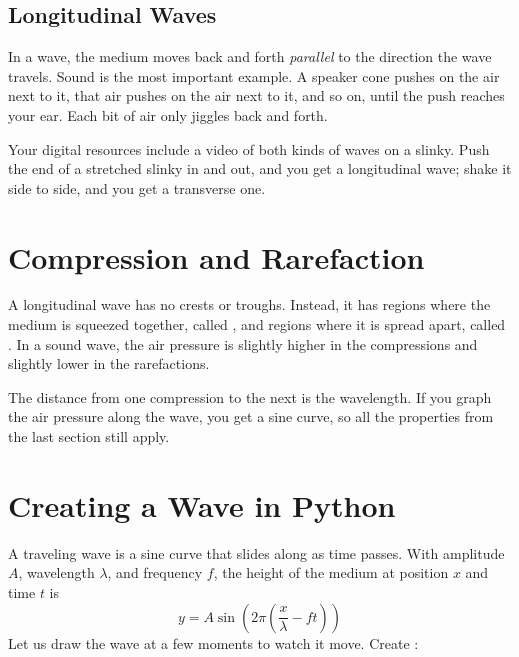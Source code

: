 \subsection*{Longitudinal Waves}
In a  wave, the medium moves
back and forth \emph{parallel} to the direction the wave travels. Sound is
the most important example. A speaker cone pushes on the air next to it,
that air pushes on the air next to it, and so on, until the push reaches
your ear. Each bit of air only jiggles back and forth.

Your digital resources include a video of both kinds of waves on a slinky.
Push the end of a stretched slinky in and out, and you get a longitudinal
wave; shake it side to side, and you get a transverse one.

\section{Compression and Rarefaction}

A longitudinal wave has no crests or troughs. Instead, it has regions where
the medium is squeezed together, called 
, and regions where it is spread apart, called
. In a sound wave, the air
pressure is slightly higher in the compressions and slightly lower in the
rarefactions.

\begin{center}
\end{center}

The distance from one compression to the next is the wavelength. If you
graph the air pressure along the wave, you get a sine curve, so all the
properties from the last section still apply.

\section{Creating a Wave in Python}

A traveling wave is a sine curve that slides along as time passes. With
amplitude $A$, wavelength $\lambda$, and frequency $f$, the height of the
medium at position $x$ and time $t$ is
$$y = A \sin\left(2\pi\left(\frac{x}{\lambda} - f t\right)\right)$$
Let us draw the wave at a few moments to watch it move. Create
:

